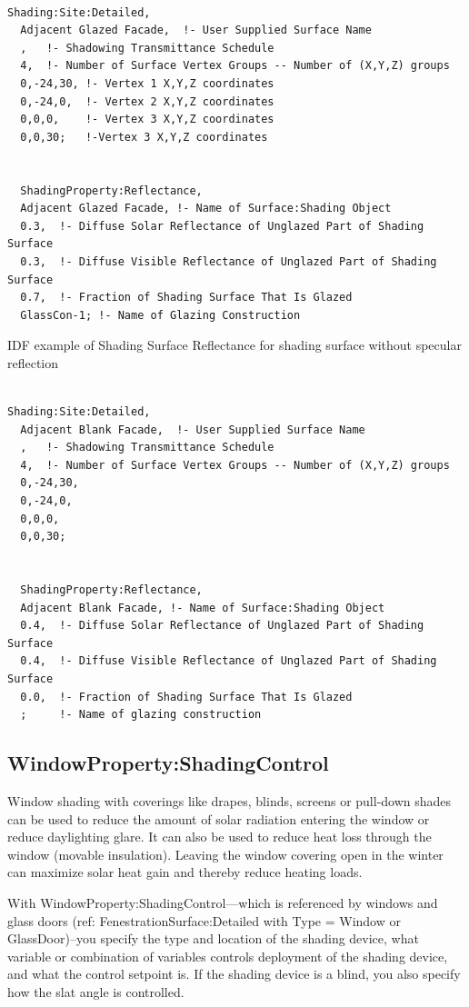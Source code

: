 \begin{lstlisting}

Shading:Site:Detailed,
  Adjacent Glazed Facade,  !- User Supplied Surface Name
  ,   !- Shadowing Transmittance Schedule
  4,  !- Number of Surface Vertex Groups -- Number of (X,Y,Z) groups
  0,-24,30, !- Vertex 1 X,Y,Z coordinates
  0,-24,0,  !- Vertex 2 X,Y,Z coordinates
  0,0,0,    !- Vertex 3 X,Y,Z coordinates
  0,0,30;   !-Vertex 3 X,Y,Z coordinates


  ShadingProperty:Reflectance,
  Adjacent Glazed Facade, !- Name of Surface:Shading Object
  0.3,  !- Diffuse Solar Reflectance of Unglazed Part of Shading Surface
  0.3,  !- Diffuse Visible Reflectance of Unglazed Part of Shading Surface
  0.7,  !- Fraction of Shading Surface That Is Glazed
  GlassCon-1; !- Name of Glazing Construction
\end{lstlisting}

IDF example of Shading Surface Reflectance for shading surface without specular reflection

\begin{lstlisting}

Shading:Site:Detailed,
  Adjacent Blank Facade,  !- User Supplied Surface Name
  ,   !- Shadowing Transmittance Schedule
  4,  !- Number of Surface Vertex Groups -- Number of (X,Y,Z) groups
  0,-24,30,
  0,-24,0,
  0,0,0,
  0,0,30;


  ShadingProperty:Reflectance,
  Adjacent Blank Facade, !- Name of Surface:Shading Object
  0.4,  !- Diffuse Solar Reflectance of Unglazed Part of Shading Surface
  0.4,  !- Diffuse Visible Reflectance of Unglazed Part of Shading Surface
  0.0,  !- Fraction of Shading Surface That Is Glazed
  ;     !- Name of glazing construction
\end{lstlisting}

\subsection{WindowProperty:ShadingControl}\label{windowpropertyshadingcontrol}

Window shading with coverings like drapes, blinds, screens or pull-down shades can be used to reduce the amount of solar radiation entering the window or reduce daylighting glare. It can also be used to reduce heat loss through the window (movable insulation). Leaving the window covering open in the winter can maximize solar heat gain and thereby reduce heating loads.

With WindowProperty:ShadingControl---which is referenced by windows and glass doors (ref: FenestrationSurface:Detailed with Type = Window or GlassDoor)--you specify the type and location of the shading device, what variable or combination of variables controls deployment of the shading device, and what the control setpoint is. If the shading device is a blind, you also specify how the slat angle is controlled.

